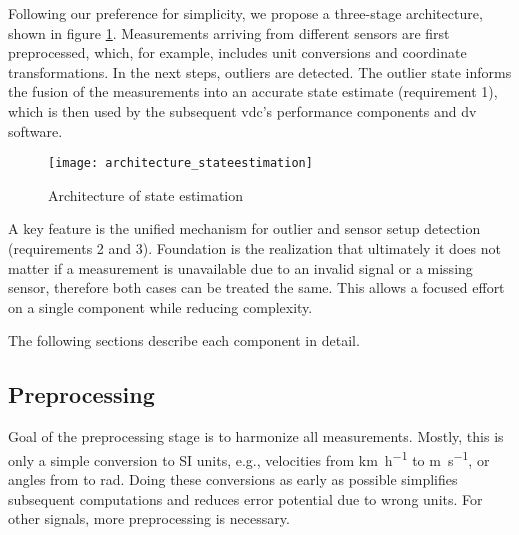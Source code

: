 Following our preference for simplicity, we propose a three-stage architecture, shown in figure \ref{fig:architecture-stateestimation}. Measurements arriving from different sensors are first preprocessed, which, for example, includes unit conversions and coordinate transformations. In the next steps, outliers are detected. The outlier state informs the fusion of the measurements into an accurate state estimate (requirement 1), which is then used by the subsequent \gls{vdc}'s performance components and \gls{dv} software.

\begin{figure}
	\centering
	\texttt{[image: architecture\_stateestimation]}%
	\caption{Architecture of state estimation}
	\label{fig:architecture-stateestimation}
\end{figure}

A key feature is the unified mechanism for outlier and sensor setup detection (requirements 2 and 3). Foundation is the realization that ultimately it does not matter if a measurement is unavailable due to an invalid signal or a missing sensor, therefore both cases can be treated the same. This allows a focused effort on a single component while reducing complexity.

The following sections describe each component in detail.


\subsection{Preprocessing}
Goal of the preprocessing stage is to harmonize all measurements. Mostly, this is only a simple conversion to SI units, e.g., velocities from \si{\kilo\meter\per\hour} to \si{\meter\per\second}, or angles from \si{\deg} to \si{\radian}. Doing these conversions as early as possible simplifies subsequent computations and reduces error potential due to wrong units. For other signals, more preprocessing is necessary.

